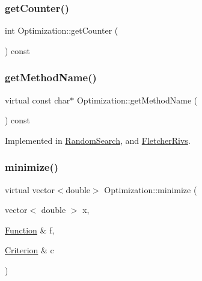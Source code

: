 \subsubsection{\texorpdfstring{get\+Counter()}{getCounter()}}
{\footnotesize\ttfamily int Optimization\+::get\+Counter (\begin{DoxyParamCaption}{ }\end{DoxyParamCaption}) const\hspace{0.3cm}{\ttfamily [inline]}}

\mbox{\label{class_optimization_af96548088d418478485c1be6ee73905d}} 
\subsubsection{\texorpdfstring{get\+Method\+Name()}{getMethodName()}}
{\footnotesize\ttfamily virtual const char$\ast$ Optimization\+::get\+Method\+Name (\begin{DoxyParamCaption}{ }\end{DoxyParamCaption}) const\hspace{0.3cm}{\ttfamily [pure virtual]}}



Implemented in \hyperlink{class_random_search_a84278cf5d586b2576c38d3b7f274d9c1}{Random\+Search}, and \hyperlink{class_fletcher_rivs_af73e7eb858fdfb37d30b97bfb38ef01e}{Fletcher\+Rivs}.

\mbox{\label{class_optimization_af24d30a738749916977a13f0d2e7fb5f}} 
\subsubsection{\texorpdfstring{minimize()}{minimize()}}
{\footnotesize\ttfamily virtual vector$<$double$>$ Optimization\+::minimize (\begin{DoxyParamCaption}\item[{vector$<$ double $>$}]{x,  }\item[{\hyperlink{class_function}{Function} \&}]{f,  }\item[{\hyperlink{class_criterion}{Criterion} \&}]{c }\end{DoxyParamCaption})\hspace{0.3cm}{\ttfamily [pure virtual]}}



